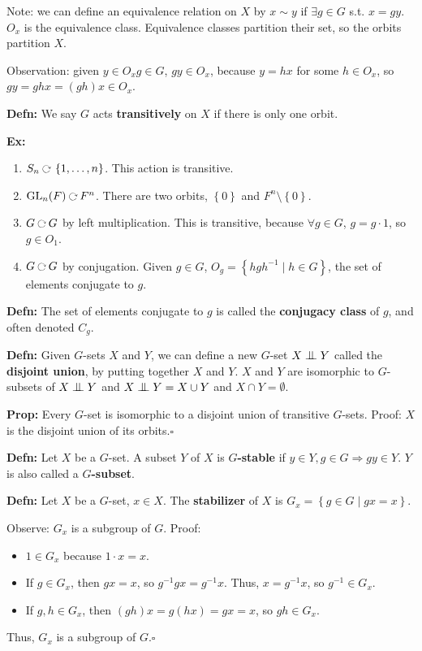 \documentclass[10pt,letterpaper]{article}
\newcommand{\n}{\hfill\break}
\newcommand{\hangblock}[2]{\par\noindent\settowidth{\hangindent}{\textbf{#1: }}\textbf{#1: }\!\!\!#2}
\newcommand{\defn}[1]{\hangblock{Defn}{#1}}
\newcommand{\prop}[1]{\hangblock{Prop}{#1}}
\newcommand{\ex}[1]{\hangblock{Ex}{#1}}
\newcommand{\proven}{\;$\square$\n}
\newcommand{\set}[1]{\left\{#1\right\}}
\newcommand{\cut}{\setminus}
\newcommand{\inv}{^{-1}}
\DeclareMathOperator{\GL}{GL}
\newcommand{\acts}{\;\rotatebox[origin=c]{-90}{$\circlearrowright$}\;}
\newcommand{\disjunion}{\mathrel{\text{\scalebox{1.07}{$\perp\mkern-10mu\perp$}}}}
\newcommand{\st}{s.t.}
\begin{document}
\par\noindent
Note: we can define an equivalence relation on $X$ by $x\sim{}y$ if $\exists{}g\in{}G$ \st{} $x=gy$. $O_{x}$ is the equivalence class.\n
Equivalence classes partition their set, so the orbits partition $X$.\n

\par\noindent
Observation: given $y\in{}O_{x}g\in{}G$, $gy\in{}O_{x}$, because $y=hx$ for some $h\in{}O_{x}$, so $gy=ghx=(gh)x\in{}O_{x}$.\n

\defn{
	We say $G$ acts \textbf{transitively} on $X$ if there is only one orbit.\n
}

\ex{
	\begin{enumerate}[leftmargin=2\parindent]
		\item $S_{n}\acts\set{1,\ldots,n}$. This action is transitive.
		\item $\GL_{n}(F)\acts{}F^{n}$. There are two orbits, $\set{0}$ and $F^{n}\cut\set{0}$.
		\item $G\acts{}G$ by left multiplication. This is transitive, because $\forall{}g\in{}G$, $g=g\cdot{}1$, so $g\in{}O_{1}$.
		\item $G\acts{}G$ by conjugation. Given $g\in{}G$, $O_{g}=\set{hgh\inv\mid{}h\in{}G}$, the set of elements conjugate to $g$.
	\end{enumerate}
}

\defn{
	The set of elements conjugate to $g$ is called the \textbf{conjugacy class} of $g$, and often denoted $C_{g}$.\n
}

\defn{
	Given $G$-sets $X$ and $Y$, we can define a new $G$-set $X\disjunion{}Y$ called the \textbf{disjoint union}, by putting together $X$ and $Y$. $X$ and $Y$ are isomorphic to $G$-subsets of $X\disjunion{}Y$ and $X\disjunion{}Y=X\cup{}Y$ and $X\cap{}Y=\emptyset$.\n
}

\prop{
	Every $G$-set is isomorphic to a disjoint union of transitive $G$-sets.\n
	Proof: $X$ is the disjoint union of its orbits.\proven
}

\defn{
	Let $X$ be a $G$-set. A subset $Y$ of $X$ is \textbf{$G$-stable} if $y\in{}Y,g\in{}G\Rightarrow{}gy\in{}Y$. $Y$ is also called a \textbf{$G$-subset}.\n
}

\defn{
	Let $X$ be a $G$-set, $x\in{}X$. The \textbf{stabilizer} of $X$ is $G_{x}=\set{g\in{}G\mid{}gx=x}$.\n
}

\par\noindent
Observe: $G_{x}$ is a subgroup of $G$.\n
Proof:
\begin{itemize}
	\item $1\in{}G_{x}$ because $1\cdot{}x=x$.
	\item If $g\in{}G_{x}$, then $gx=x$, so $g\inv{}gx=g\inv{}x$. Thus, $x=g\inv{}x$, so $g\inv\in{}G_{x}$.
	\item If $g,h\in{}G_{x}$, then $(gh)x=g(hx)=gx=x$, so $gh\in{}G_{x}$.
\end{itemize}
Thus, $G_{x}$ is a subgroup of $G$.\proven
\end{document}
